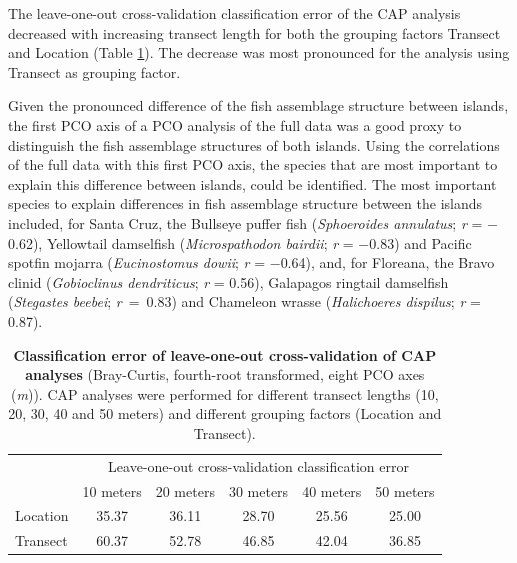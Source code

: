 \documentclass[10pt,letterpaper]{article}
\begin{document}
The leave-one-out cross-validation classification error of the CAP analysis decreased with increasing transect length for both the grouping factors Transect and Location (Table \ref{classificationerrorCAPtable}). The decrease was most pronounced for the analysis using Transect as grouping factor. 

Given the pronounced difference of the fish assemblage structure between islands, the first PCO axis of a PCO analysis of the full data was a good proxy to distinguish the fish assemblage structures of both islands. Using the correlations of the full data with this first PCO axis, the species that are most important to explain this difference between islands, could be identified. The most important species to explain differences in fish assemblage structure between the islands included, for Santa Cruz, the Bullseye puffer fish (\textit{Sphoeroides annulatus}; \textit{r} = $-$0.62), Yellowtail damselfish (\textit{Microspathodon bairdii}; \textit{r} = $-$0.83) and Pacific spotfin mojarra (\textit{Eucinostomus dowii}; \textit{r} = $-$0.64), and, for Floreana, the Bravo clinid (\textit{Gobioclinus dendriticus}; \textit{r} = 0.56), Galapagos ringtail damselfish (\textit{Stegastes beebei}; \mbox{\textit{r} = 0.83}) and Chameleon wrasse (\textit{Halichoeres dispilus}; \textit{r} = 0.87).

\renewcommand{\arraystretch}{1.25}
\begin{table}
\centering
\scriptsize
\caption{{\bf Classification error of leave-one-out cross-validation of CAP analyses} (Bray-Curtis, fourth-root transformed, eight PCO axes (\textit{m})). CAP analyses were performed for different transect lengths (10, 20, 30, 40 and 50 meters) and different grouping factors (Location and Transect).}
\label{classificationerrorCAPtable}
\begin{tabular}{l|ccccc} 
\toprule
\multirow{2}{*}{} & \multicolumn{5}{c}{Leave-one-out cross-validation classification error}  \\ 
                  & 10 meters & 20 meters & 30 meters & 40 meters & 50 meters                      \\ 
\midrule
Location          & 35.37    & 36.11    & 28.70    & 25.56    & 25.00                         \\ 
Transect          & 60.37    & 52.78    & 46.85    & 42.04    & 36.85                         \\
\bottomrule
\end{tabular}
\end{table}
\renewcommand{\arraystretch}{1}
\end{document}
